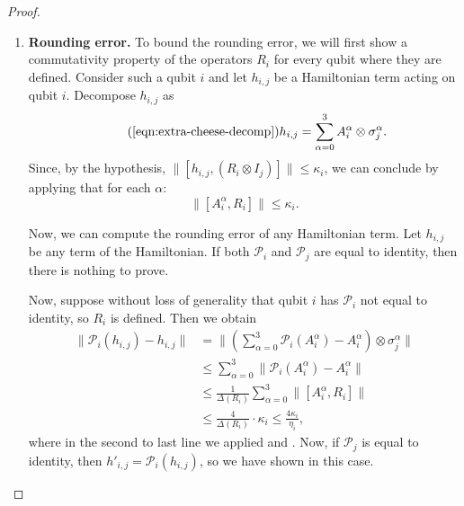 \documentclass[a4paper,onecolumn,11pt]{quantumarticle}
\theoremstyle{plain}
\renewcommand{\cP}{\mathcal{P}}
\begin{document}
\begin{proof}
\begin{enumerate}
\item \textbf{Rounding error.} To bound the rounding error, we will first show a commutativity property of the operators $R_i$ for every qubit where they are defined. Consider such a qubit $i$ and let $h_{i,j}$ be a Hamiltonian term acting on qubit $i$. Decompose $h_{i,j}$ as
\begin{equation}\tag{\ref{eqn:extra-cheese-decomp}}
    h_{i,j}  = \sum_{\alpha=0}^3 A_i^\alpha \otimes \sigma_j^\alpha. 
\end{equation}
Since, by the hypothesis, $\|[h_{i,j},(R_i \otimes I_j) ]\| \leq \kappa_i$, we can conclude by applying  that for each $\alpha$:
\begin{equation}
 \| [A_i^\alpha, R_i] \| \leq \kappa_i. \label{eq:R-commutator}
\end{equation}


Now, we can compute the rounding error of any Hamiltonian term. Let $h_{i,j}$ be any term of the Hamiltonian. If both $\cP_i$ and $\cP_j$ are equal to identity, then there is nothing to prove.

Now, suppose without loss of generality that qubit $i$ has $\cP_i$ not equal to identity, so $R_i$ is defined. Then we obtain
\begin{align}
    \| \cP_i(h_{i,j}) - h_{i,j} \| &= \| (\sum_{\alpha =0}^3 \cP_i(A_i^\alpha)  - A_i^\alpha) \otimes \sigma_j^\alpha \| \\
    &\leq \sum_{\alpha =0}^3 \| \cP_i(A_i^\alpha) - A_i^\alpha\| \\
    &\leq  \frac{1}{\Delta(R_i)} \sum_{\alpha =0}^3 \|[A_i^\alpha, R_i] \| \\
    &\leq \frac{4}{\Delta(R_i)} \cdot \kappa_i \leq \frac{4 \kappa_i}{\eta_i},
 \end{align}
 where in the second to last line we applied  and . Now, if $\cP_j$ is equal to identity, then $h'_{i,j} = \cP_i(h_{i,j})$, so we have shown  in this case.


\end{enumerate}
\end{proof}
\end{document}
